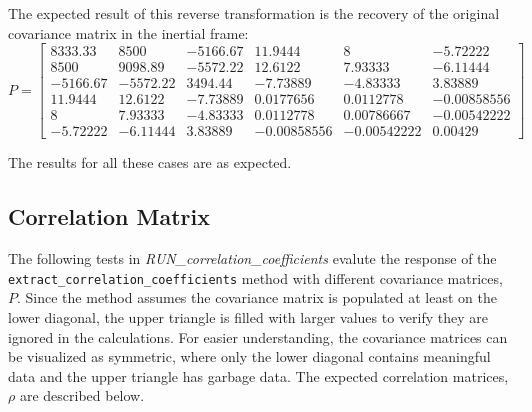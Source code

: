 \documentclass[11pt,fleqn]{report}
\begin{document}
\begin{enumerate}
{The expected result of this reverse transformation is the recovery of the 
original covariance matrix in the inertial frame:
\begin{equation*}
P = 
\begin{bmatrix}
8333.33	 & 8500	& -5166.67 &	11.9444	 & 8	& -5.72222 \\
8500	 & 9098.89	& -5572.22 &	12.6122	 & 7.93333	& -6.11444 \\
-5166.67 & -5572.22	& 3494.44	 & -7.73889	 & -4.83333	& 3.83889 \\
11.9444	 & 12.6122	& -7.73889 &	0.0177656	 & 0.0112778	& -0.00858556 \\
8	 & 7.93333	& -4.83333 &	0.0112778	 & 0.00786667	& -0.00542222 \\
-5.72222 & -6.11444	& 3.83889	 & -0.00858556 &	-0.00542222	&0.00429
\end{bmatrix}
\end{equation*}
}
\end{enumerate}

The results for all these cases are as expected.

\subsection{Correlation Matrix}
The following tests in \textit{RUN\_correlation\_coefficients}
evalute the response of the \\ \texttt{extract\_correlation\_coefficients}
method with different covariance matrices, $P$. Since the method assumes the 
covariance matrix is populated at least on the lower diagonal, the upper
triangle is filled with larger values to verify they are ignored in the
calculations. For easier understanding, the covariance matrices can be 
visualized as symmetric, where only the lower diagonal contains meaningful
data and the upper triangle has garbage data. The expected correlation matrices, $\rho$ are
described below.
\end{document}
